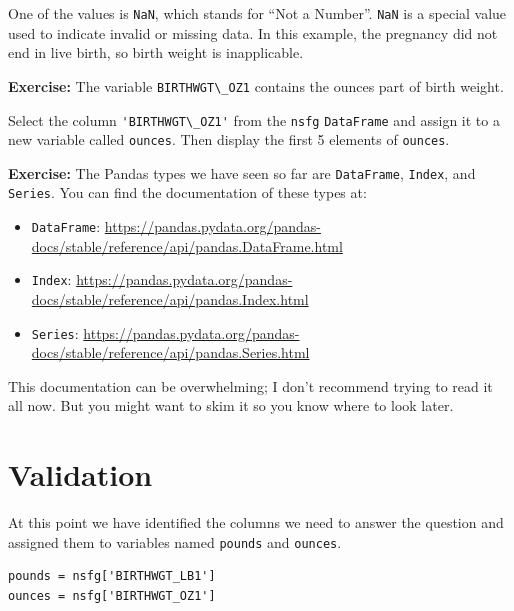 One of the values is \passthrough{\lstinline!NaN!}, which stands for
``Not a Number''. \passthrough{\lstinline!NaN!} is a special value used
to indicate invalid or missing data. In this example, the pregnancy did
not end in live birth, so birth weight is inapplicable.

\textbf{Exercise:} The variable \passthrough{\lstinline!BIRTHWGT\_OZ1!}
contains the ounces part of birth weight.

Select the column \passthrough{\lstinline!'BIRTHWGT\_OZ1'!} from the
\passthrough{\lstinline!nsfg!} \passthrough{\lstinline!DataFrame!} and
assign it to a new variable called \passthrough{\lstinline!ounces!}.
Then display the first 5 elements of \passthrough{\lstinline!ounces!}.

\textbf{Exercise:} The Pandas types we have seen so far are
\passthrough{\lstinline!DataFrame!}, \passthrough{\lstinline!Index!},
and \passthrough{\lstinline!Series!}. You can find the documentation of
these types at:

\begin{itemize}
\item
  \passthrough{\lstinline!DataFrame!}:
  \url{https://pandas.pydata.org/pandas-docs/stable/reference/api/pandas.DataFrame.html}
\item
  \passthrough{\lstinline!Index!}:
  \url{https://pandas.pydata.org/pandas-docs/stable/reference/api/pandas.Index.html}
\item
  \passthrough{\lstinline!Series!}:
  \url{https://pandas.pydata.org/pandas-docs/stable/reference/api/pandas.Series.html}
\end{itemize}

This documentation can be overwhelming; I don't recommend trying to read
it all now. But you might want to skim it so you know where to look
later.

\hypertarget{validation}{%
\section{Validation}\label{validation}}

At this point we have identified the columns we need to answer the
question and assigned them to variables named
\passthrough{\lstinline!pounds!} and \passthrough{\lstinline!ounces!}.

\begin{lstlisting}[]
pounds = nsfg['BIRTHWGT_LB1']
ounces = nsfg['BIRTHWGT_OZ1']
\end{lstlisting}

